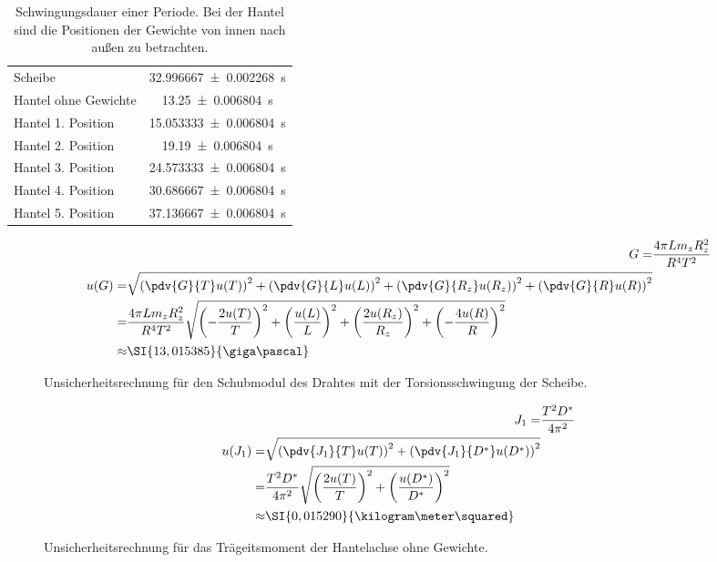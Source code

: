 \begin{table}[h]
	\centering
	\caption{Schwingungsdauer einer Periode. Bei der Hantel sind die Positionen der Gewichte von innen nach außen zu betrachten.}
	\label{tab:schwingungsperioden}
	\begin{tabular}{l|S}
		\hline
		{Scheibe} & \SI{32,996667 +-0,002268}{\second}\\
		{Hantel ohne Gewichte} & \SI{13,25+-0,006804}{\second}\\
		{Hantel 1. Position} & \SI{15,053333+-0,006804}{\second}\\
		{Hantel 2. Position} & \SI{19,19+-0,006804}{\second}\\
		{Hantel 3. Position} & \SI{24,573333+-0,006804}{\second}\\
		{Hantel 4. Position} & \SI{30,686667+-0,006804}{\second}\\
		{Hantel 5. Position} & \SI{37,136667+-0,006804}{\second}\\
		\hline
	\end{tabular}
\end{table}

\begin{figure}[h]
	\centering
	\begin{align}
	G =& \frac{4\pi L m_z R_z^2}{R^4 T^2}\\
	\begin{split}
		\label{eq:G-unc}
		u(G) =& \sqrt{\left( \pdv{G}{T} u(T) \right) ^2 + \left( \pdv{G}{L} u(L) \right) ^2 + \left( \pdv{G}{R_z} u(R_z) \right) ^2 + \left( \pdv{G}{R} u(R) \right) ^2}\\
		=& \frac{4\pi L m_z R_z^2}{R^4 T^2} \sqrt{\left(-\frac{2u(T)}{T} \right) ^2 + \left( \frac{u(L)}{L} \right) ^2 + \left( \frac{2u(R_z)}{R_z} \right) ^2 + \left( -\frac{4u(R)}{R} \right) ^2}\\
		\approx & \SI{13,015385}{\giga\pascal}
	\end{split}
	\end{align}
	\caption{Unsicherheitsrechnung für den Schubmodul des Drahtes mit der Torsionsschwingung der Scheibe.}
\end{figure}

\begin{figure}[h]
	\centering
	\begin{align}
		J_1 =& \frac{T^2 D^*}{4\pi^2}\\
		\begin{split}
			\label{eq:hantel-J1-unc}
			u(J_1) =& \sqrt{\left( \pdv{J_1}{T} u(T) \right) ^2 + \left( \pdv{J_1}{D^*} u(D^*) \right) ^2}\\
			=& \frac{T^2 D^*}{4\pi^2} \sqrt{\left( \frac{2 u(T)}{T} \right) ^2 + \left( \frac{u(D^*)}{D^*} \right)^2}\\
			\approx & \SI{0,015290}{\kilogram\meter\squared}
		\end{split}
	\end{align}
	\caption{Unsicherheitsrechnung für das Trägeitsmoment der Hantelachse ohne Gewichte.}
\end{figure}

